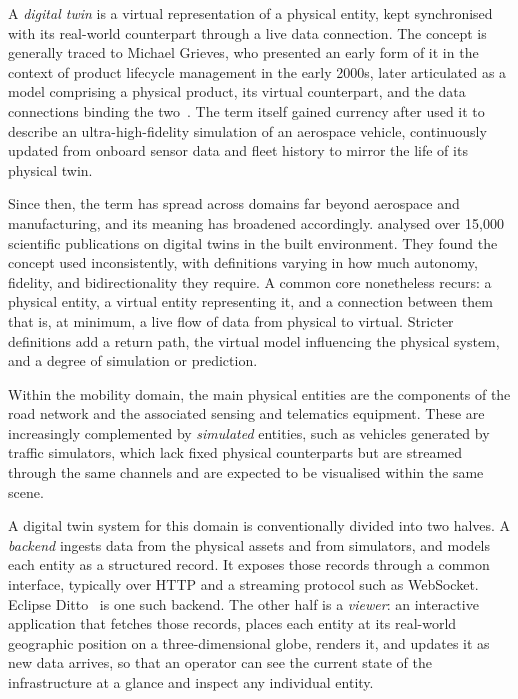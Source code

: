 A \emph{digital twin} is a virtual representation of a physical entity, kept synchronised with its real-world counterpart through a live data connection. The concept is generally traced to Michael Grieves, who presented an early form of it in the context of product lifecycle management in the early 2000s, later articulated as a model comprising a physical product, its virtual counterpart, and the data connections binding the two~\cite{grieves2016digitaltwin}. The term itself gained currency after \textcite{glaessgen2012digitaltwin} used it to describe an ultra-high-fidelity simulation of an aerospace vehicle, continuously updated from onboard sensor data and fleet history to mirror the life of its physical twin.

Since then, the term has spread across domains far beyond aerospace and manufacturing, and its meaning has broadened accordingly. \textcite{abdelrahman2025whatisdigitaltwin} analysed over 15,000 scientific publications on digital twins in the built environment. They found the concept used inconsistently, with definitions varying in how much autonomy, fidelity, and bidirectionality they require. A common core nonetheless recurs: a physical entity, a virtual entity representing it, and a connection between them that is, at minimum, a live flow of data from physical to virtual. Stricter definitions add a return path, the virtual model influencing the physical system, and a degree of simulation or prediction.

Within the mobility domain, the main physical entities are the components of the road network and the associated sensing and telematics equipment. These are increasingly complemented by \emph{simulated} entities, such as vehicles generated by traffic simulators, which lack fixed physical counterparts but are streamed through the same channels and are expected to be visualised within the same scene.

A digital twin system for this domain is conventionally divided into two halves. A \emph{backend} ingests data from the physical assets and from simulators, and models each entity as a structured record. It exposes those records through a common interface, typically over HTTP and a streaming protocol such as WebSocket. Eclipse Ditto~\cite{kherbache2022ditto} is one such backend. The other half is a \emph{viewer}: an interactive application that fetches those records, places each entity at its real-world geographic position on a three-dimensional globe, renders it, and updates it as new data arrives, so that an operator can see the current state of the infrastructure at a glance and inspect any individual entity.

